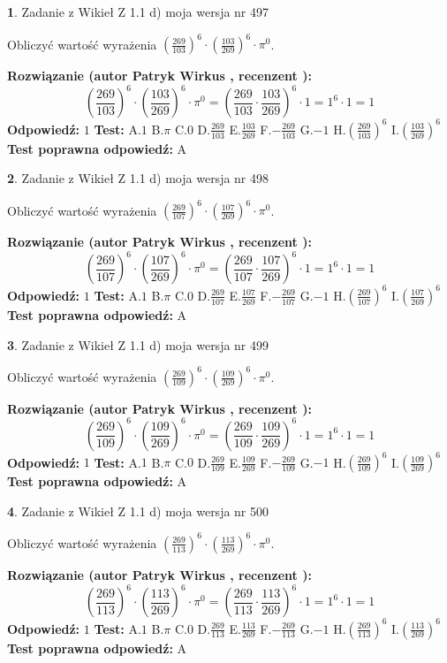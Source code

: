 \documentclass[12pt, a4paper]{article}
\theoremstyle{definition} %
\newtheorem{zad}{}
\newcommand{\zadStart}[1]{\begin{zad}#1\newline}
\newcommand{\zadStop}{\end{zad}}
\newcommand{\rozwStart}[2]{\noindent \textbf{Rozwiązanie (autor #1 , recenzent #2): }\newline}
\newcommand{\rozwStop}{\newline}
\newcommand{\odpStart}{\noindent \textbf{Odpowiedź:}\newline}
\newcommand{\odpStop}{\newline}
\newcommand{\testStart}{\noindent \textbf{Test:}\newline}
\newcommand{\testStop}{\newline}
\newcommand{\kluczStart}{\noindent \textbf{Test poprawna odpowiedź:}\newline}
\newcommand{\kluczStop}{\newline}
\begin{document}
\zadStart{Zadanie z Wikieł Z 1.1 d) moja wersja nr 497}

Obliczyć wartość wyrażenia $(\frac{269}{103})^{6} \cdot (\frac{103}{269})^{6} \cdot \pi^{0}$.
\zadStop
\rozwStart{Patryk Wirkus}{}
$$(\frac{269}{103})^{6} \cdot (\frac{103}{269})^{6} \cdot \pi^{0} = (\frac{269}{103} \cdot \frac{103}{269})^{6} \cdot 1 = 1^{6} \cdot 1 = 1$$
\rozwStop
\odpStart
$1$
\odpStop
\testStart
A.$1$ B.$\pi$ C.$0$ D.$\frac{269}{103}$ E.$\frac{103}{269}$
F.$-\frac{269}{103}$ G.$-1$
H.$(\frac{269}{103})^{6}$
I.$(\frac{103}{269})^{6}$
\testStop
\kluczStart
A
\kluczStop



\zadStart{Zadanie z Wikieł Z 1.1 d) moja wersja nr 498}

Obliczyć wartość wyrażenia $(\frac{269}{107})^{6} \cdot (\frac{107}{269})^{6} \cdot \pi^{0}$.
\zadStop
\rozwStart{Patryk Wirkus}{}
$$(\frac{269}{107})^{6} \cdot (\frac{107}{269})^{6} \cdot \pi^{0} = (\frac{269}{107} \cdot \frac{107}{269})^{6} \cdot 1 = 1^{6} \cdot 1 = 1$$
\rozwStop
\odpStart
$1$
\odpStop
\testStart
A.$1$ B.$\pi$ C.$0$ D.$\frac{269}{107}$ E.$\frac{107}{269}$
F.$-\frac{269}{107}$ G.$-1$
H.$(\frac{269}{107})^{6}$
I.$(\frac{107}{269})^{6}$
\testStop
\kluczStart
A
\kluczStop



\zadStart{Zadanie z Wikieł Z 1.1 d) moja wersja nr 499}

Obliczyć wartość wyrażenia $(\frac{269}{109})^{6} \cdot (\frac{109}{269})^{6} \cdot \pi^{0}$.
\zadStop
\rozwStart{Patryk Wirkus}{}
$$(\frac{269}{109})^{6} \cdot (\frac{109}{269})^{6} \cdot \pi^{0} = (\frac{269}{109} \cdot \frac{109}{269})^{6} \cdot 1 = 1^{6} \cdot 1 = 1$$
\rozwStop
\odpStart
$1$
\odpStop
\testStart
A.$1$ B.$\pi$ C.$0$ D.$\frac{269}{109}$ E.$\frac{109}{269}$
F.$-\frac{269}{109}$ G.$-1$
H.$(\frac{269}{109})^{6}$
I.$(\frac{109}{269})^{6}$
\testStop
\kluczStart
A
\kluczStop



\zadStart{Zadanie z Wikieł Z 1.1 d) moja wersja nr 500}

Obliczyć wartość wyrażenia $(\frac{269}{113})^{6} \cdot (\frac{113}{269})^{6} \cdot \pi^{0}$.
\zadStop
\rozwStart{Patryk Wirkus}{}
$$(\frac{269}{113})^{6} \cdot (\frac{113}{269})^{6} \cdot \pi^{0} = (\frac{269}{113} \cdot \frac{113}{269})^{6} \cdot 1 = 1^{6} \cdot 1 = 1$$
\rozwStop
\odpStart
$1$
\odpStop
\testStart
A.$1$ B.$\pi$ C.$0$ D.$\frac{269}{113}$ E.$\frac{113}{269}$
F.$-\frac{269}{113}$ G.$-1$
H.$(\frac{269}{113})^{6}$
I.$(\frac{113}{269})^{6}$
\testStop
\kluczStart
A
\kluczStop
\end{document}
